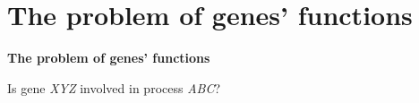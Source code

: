 \documentclass[aspectratio=169,9pt,handout]{beamer}
\begin{document}
\section{The problem of genes' functions}

\begin{frame}[t]
	\textcolor{uscgold}{
		\Large {\bf The problem of genes' functions}
	}
\end{frame}


\begin{frame}[c]
	
	\Large Is gene \textit{XYZ} involved in process \textit{ABC}?\normalsize\bigskip
	

\end{frame}
\end{document}
